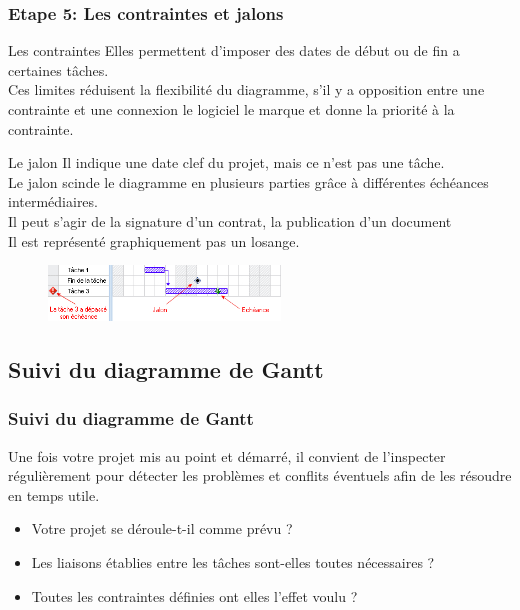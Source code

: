 \documentclass{beamer}
\begin{document}
\begin{frame}
  \frametitle{Etape 5: Les contraintes et jalons}
  \begin{block}{Les contraintes}
   Elles permettent d'imposer des dates de début ou de fin a certaines tâches.
   \\ Ces limites réduisent la flexibilité du diagramme, s'il y a opposition entre une contrainte et une connexion le logiciel le marque et donne la priorité à la contrainte.
   \end{block}
 \begin{block}{Le jalon}
   Il indique une date clef du projet, mais ce n'est pas une tâche.
   \\Le jalon scinde le diagramme en plusieurs parties grâce à différentes échéances intermédiaires.
   \\Il peut s'agir de la signature d'un contrat, la publication d'un document
   \\ Il est représenté graphiquement pas un losange.
  \end{block}
  \begin{figure}
    \centering
    \includegraphics[width=0.55\textwidth]{JC}
  \end{figure}
\end{frame}


\subsection{Suivi du diagramme de Gantt}

\begin{frame}
  \frametitle{Suivi du diagramme de Gantt}
  Une fois votre projet mis au point et démarré, il convient de l'inspecter régulièrement pour détecter les problèmes et conflits éventuels afin de les résoudre en temps utile.
  \begin{itemize}[<+-| alert@+>]
  \item Votre projet se déroule-t-il comme prévu ?
  \item Les liaisons établies entre les tâches sont-elles toutes nécessaires ?
  \item Toutes les contraintes définies ont elles l'effet voulu ?
  \end{itemize}
\end{frame}
\end{document}
